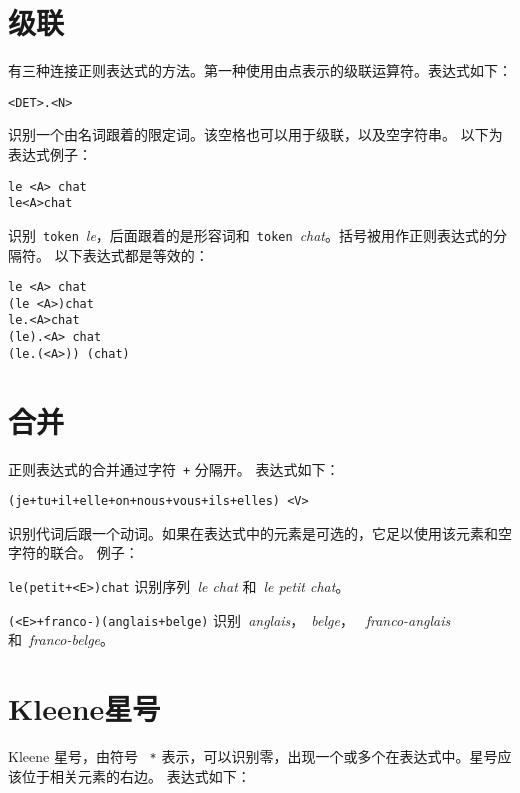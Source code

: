 \section{级联}

有三种连接正则表达式的方法。第一种使用由点表示的级联运算符。表达式如下：

\begin{verbatim}
<DET>.<N>
\end{verbatim}

\noindent 识别一个由名词跟着的限定词。该空格也可以用于级联，以及空字符串。
以下为表达式例子： 


\begin{verbatim}
le <A> chat
le<A>chat
\end{verbatim}

\noindent 识别\ \verb+token+\ \textit{le}，后面跟着的是形容词和\ \verb+token+\ \textit{chat}。括号被用作正则表达式的分隔符。
以下表达式都是等效的：


\begin{verbatim}
le <A> chat
(le <A>)chat
le.<A>chat
(le).<A> chat
(le.(<A>)) (chat)
\end{verbatim}

\section{合并}
\index{\verb$+$}
正则表达式的合并通过字符\ \verb$+$ 分隔开。 
表达式如下：

\begin{verbatim}
(je+tu+il+elle+on+nous+vous+ils+elles) <V>
\end{verbatim}

\noindent
识别代词后跟一个动词。如果在表达式中的元素是可选的，它足以使用该元素和空字符的联合。 
 例子：

\bigskip
\noindent \verb$le(petit+<E>)chat$ 识别序列\ \textit{le chat} 和\ \textit{le petit chat}。

\smallskip
\noindent \verb$(<E>+franco-)(anglais+belge)$ 识别\ \textit{anglais}，\ \textit{belge}，
\ \textit{franco-anglais} 和\ \textit{franco-belge}。

\section{Kleene星号}
\index{\verb+*+}
Kleene 星号，由符号 \ \verb+*+ 表示，可以识别零，出现一个或多个在表达式中。星号应该位于相关元素的右边。
表达式如下：


